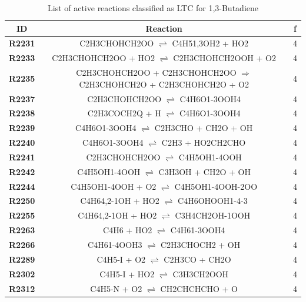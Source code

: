 \begin{table}[!ht]
\centering
\caption{List of active reactions classified as LTC for 1,3-Butadiene}
\label{table:1,3-Butadiene_LTC}
\begin{tabular}{ccc}
\hline
\textbf{ID} & \textbf{Reaction} & \textbf{f} \\
\hline
\textbf{R2231} & C2H3CHOHCH2OO $\rightleftharpoons$ C4H51,3OH2 + HO2 & 4 \\
\textbf{R2233} & C2H3CHOHCH2OO + HO2 $\rightleftharpoons$ C2H3CHOHCH2OOH + O2 & 4 \\
\textbf{R2235} & C2H3CHOHCH2OO + C2H3CHOHCH2OO $\Rightarrow$ C2H3CHOHCH2O + C2H3CHOHCH2O + O2 & 4 \\
\textbf{R2237} & C2H3CHOHCH2OO $\rightleftharpoons$ C4H6O1-3OOH4 & 4 \\
\textbf{R2238} & C2H3COCH2Q + H $\rightleftharpoons$ C4H6O1-3OOH4 & 4 \\
\textbf{R2239} & C4H6O1-3OOH4 $\rightleftharpoons$ C2H3CHO + CH2O + OH & 4 \\
\textbf{R2240} & C4H6O1-3OOH4 $\rightleftharpoons$ C2H3 + HO2CH2CHO & 4 \\
\textbf{R2241} & C2H3CHOHCH2OO $\rightleftharpoons$ C4H5OH1-4OOH & 4 \\
\textbf{R2242} & C4H5OH1-4OOH $\rightleftharpoons$ C3H3OH + CH2O + OH & 4 \\
\textbf{R2244} & C4H5OH1-4OOH + O2 $\rightleftharpoons$ C4H5OH1-4OOH-2OO & 4 \\
\textbf{R2250} & C4H64,2-1OH + HO2 $\rightleftharpoons$ C4H6OHOOH1-4-3 & 4 \\
\textbf{R2255} & C4H64,2-1OH + HO2 $\rightleftharpoons$ C3H4CH2OH-1OOH & 4 \\
\textbf{R2263} & C4H6 + HO2 $\rightleftharpoons$ C4H61-3OOH4 & 4 \\
\textbf{R2266} & C4H61-4OOH3 $\rightleftharpoons$ C2H3CHOCH2 + OH & 4 \\
\textbf{R2289} & C4H5-I + O2 $\rightleftharpoons$ C2H3CO + CH2O & 4 \\
\textbf{R2302} & C4H5-I + HO2 $\rightleftharpoons$ C3H3CH2OOH & 4 \\
\textbf{R2312} & C4H5-N + O2 $\rightleftharpoons$ CH2CHCHCHO + O & 4 \\
\hline
\end{tabular}
\end{table}